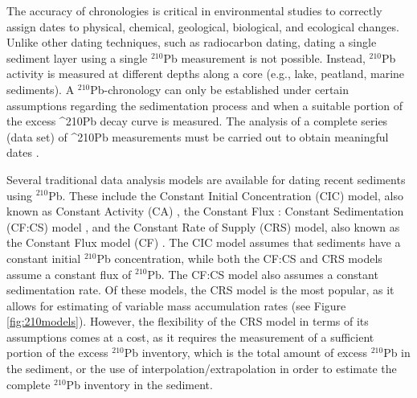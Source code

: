 \documentclass [10pt] {article}
\begin{document}
	The accuracy of chronologies is critical in environmental studies to correctly assign dates to physical, chemical, geological, biological, and ecological changes. Unlike other dating techniques, such as radiocarbon dating, dating a single sediment layer using a single $^{210}$Pb measurement is not possible. Instead, $^{210}$Pb activity is measured at different depths along a core (e.g., lake, peatland, marine sediments). A $^{210}$Pb-chronology can only be established under certain assumptions regarding the sedimentation process and when a suitable portion of the excess ^210Pb decay curve is measured. The analysis of a complete series (data set) of ^210Pb measurements must be carried out to obtain meaningful dates \citet{Aquino2018}.




Several traditional data analysis models are available for dating recent sediments using $^{210}$Pb. These include the Constant Initial Concentration (CIC) model, also known as Constant Activity (CA) \citep{Goldberg1963, Robbins1975}, the Constant Flux : Constant Sedimentation (CF:CS) model \citep{Crozaz1964}, and the Constant Rate of Supply (CRS) model, also known as the Constant Flux model (CF) \citep{Appleby1978, Robbins1978, Sanchez-Cabeza2012}. The CIC model assumes that sediments have a constant initial $^{210}$Pb concentration, while both the CF:CS and CRS models assume a constant flux of $^{210}$Pb. The CF:CS model also assumes a constant sedimentation rate. Of these models, the CRS model is the most popular, as it allows for estimating of variable mass accumulation rates (see Figure \ref{fig:210models}). However, the flexibility of the CRS model in terms of its assumptions comes at a cost, as it requires the measurement of a sufficient portion of the excess $^{210}$Pb inventory, which is the total amount of excess $^{210}$Pb in the sediment, or the use of interpolation/extrapolation in order to estimate the complete $^{210}$Pb inventory in the sediment.
\end{document}

